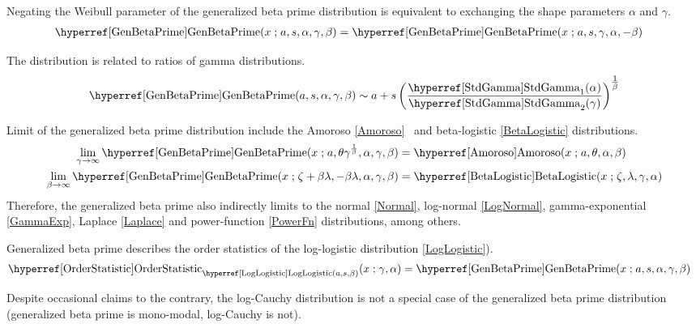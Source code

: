 

Negating the Weibull parameter of the generalized beta prime distribution is equivalent to exchanging the shape parameters  $\alpha$ and $\gamma$.
\begin{align*}
\opr{GenBetaPrime}&(x\given a, s, \alpha,\gamma,\beta)  = \opr{GenBetaPrime}(x\given a, s,\gamma, \alpha,-\beta) \checked
\end{align*}

The distribution is related to ratios of gamma distributions.
\[
\opr{GenBetaPrime}(a,s,\alpha,\gamma,\beta) \sim a+ s\left( \frac{\opr{StdGamma}_1(\alpha)}{\opr{StdGamma}_2(\gamma) } \right)^{\tfrac{1}{\beta}} \checked
\]

Limit of the generalized beta prime distribution include the Amoroso \eqref{Amoroso}~\cite{McDonald1984} and beta-logistic \eqref{BetaLogistic} distributions.
\begin{align*}
\lim_{\gamma\rightarrow\infty} \opr{GenBetaPrime}(x\given a, \theta \gamma^{\frac{1}{\beta}} ,\alpha, \gamma, \beta )  
& = \opr{Amoroso}(x\given a,\theta,\alpha, \beta) \checked \\
\lim_{\beta\rightarrow\infty}  \opr{GenBetaPrime}(x\given  \pLoc+\beta\pScale, -\beta \pScale, \alpha, \gamma, \beta)  
 & = \opr{BetaLogistic}(x\given \pLoc,\pScale, \gamma, \alpha) \checked
\end{align*}
Therefore, the generalized beta prime also indirectly limits to the normal \eqref{Normal}, log-normal \eqref{LogNormal}, gamma-exponential \eqref{GammaExp}, Laplace \eqref{Laplace} and power-function \eqref{PowerFn} distributions, among others.

Generalized beta prime describes the order statistics  of the log-logistic distribution \eqref{LogLogistic}). 
\begin{align*}
 \opr{OrderStatistic}_{\opr{LogLogistic}(a,s,\beta)}(x \given \gamma, \alpha ) & =  \opr{GenBetaPrime}(x\given a, s, \alpha, \gamma, \beta)  \checked
\end{align*}


Despite occasional claims to the contrary,%
the log-Cauchy distribution is not a special case of the generalized beta prime distribution (generalized beta prime is mono-modal, log-Cauchy is not).






